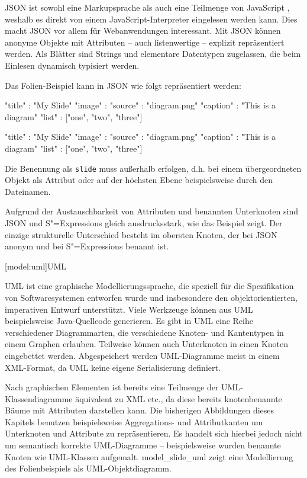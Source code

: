\documentclass[12pt, a4paper, bibgerm]{scrbook}
\newenvironment{DIFnomarkup}{}{}
\newcommand\icode[1]{\lstinline?#1?}
\newcommand\lsection{}
\newcommand\abb{}
\newcommand{\sexps}{S"=Expressions}
\begin{document}
JSON ist sowohl eine Markupsprache als auch eine Teilmenge von
JavaScript \cite{JavaScript}, weshalb es direkt von einem
JavaScript-Interpreter eingelesen werden kann. Dies macht JSON vor allem
für Webanwendungen interessant. Mit JSON können anonyme Objekte mit
Attributen -- auch listenwertige -- explizit repräsentiert werden. Als
Blätter sind Strings und elementare Datentypen zugelassen, die beim
Einlesen dynamisch typisiert werden.

Das Folien-Beispiel kann in JSON wie folgt repräsentiert werden:
\begin{DIFnomarkup}\begin{code}
{
  "title" : "My Slide"
  "image" : {
    "source"  : "diagram.png"
    "caption" : "This is a diagram"
  }
  "list"  : ["one", "two", "three"]
}
\end{code}\end{DIFnomarkup}
\begin{DIFnomarkup}\begin{code}
{
  "title" : "My Slide"
  "image" : {
    "source"  : "diagram.png"
    "caption" : "This is a diagram"
  }
  "list"  : ["one", "two", "three"]
}
\end{code}\end{DIFnomarkup}
Die Benennung als \icode{slide} muss außerhalb erfolgen, d.h. bei einem
übergeordneten Objekt als Attribut oder auf der höchsten Ebene
beispielsweise durch den Dateinamen.

Aufgrund der Austauschbarkeit von Attributen und benannten Unterknoten
sind JSON und \sexps{} gleich ausdrucksstark, wie das Beispiel
zeigt. Der einzige strukturelle Unterschied besteht im obersten Knoten,
der bei JSON anonym und bei \sexps{} benannt ist.

\lsection[model:uml]{UML}

UML ist eine graphische Modellierungssprache, die speziell für die
Spezifikation von Softwaresystemen entworfen wurde und insbesondere den
objektorientierten, imperativen Entwurf unterstützt. Viele Werkzeuge können
aus UML beispielsweise Java-Quellcode generieren. Es gibt in UML eine
Reihe verschiedener Diagrammarten, die verschiedene Knoten- und
Kantentypen in einem Graphen erlauben. Teilweise können auch Unterknoten
in einen Knoten eingebettet werden. Abgespeichert werden UML-Diagramme
meist in einem XML-Format, da UML keine eigene Serialisierung definiert.

Nach graphischen Elementen ist bereits eine Teilmenge der
UML-Klassen\-diagramme äquivalent zu XML etc., da diese bereits
knotenbenannte Bäume mit Attributen darstellen kann. Die bisherigen
Abbildungen dieses Kapitels benutzen beispielsweise Aggregations- und
Attributkanten um Unterknoten und Attribute zu repräsentieren.  Es
handelt sich hierbei jedoch nicht um semantisch korrekte UML-Diagramme --
beispielsweise wurden benannte Knoten wie UML-Klassen
aufgemalt. \abb{model_slide_uml} zeigt eine Modellierung des
Folienbeispiels als UML-Objektdiagramm.
\end{document}
